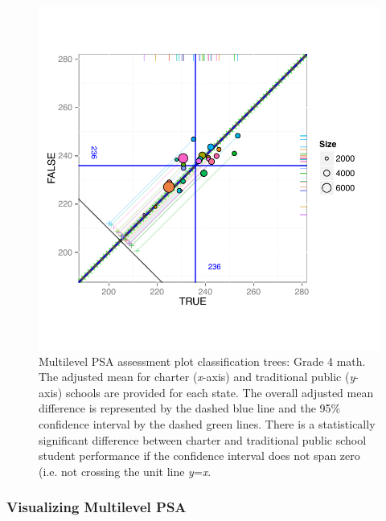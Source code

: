 \documentclass[letterpaper,12pt]{article} %
\begin{document}
\setlength{\belowcaptionskip}{-15pt}
\begin{figure}[t!]
\begin{center}
\includegraphics[width=\textwidth,trim=0 .1in 0 .5in]{../Figures2009/g4math-mlpsa-ctree-circ.pdf}
\caption[Multilevel PSA assessment plot classification trees: Grade 4 math]{Multilevel PSA assessment plot classification trees: Grade 4 math. The adjusted mean for charter (\textit{x}-axis) and traditional public (\textit{y}-axis) schools are provided for each state. The overall adjusted mean difference is represented by the dashed blue line and the 95\% confidence interval by the dashed green lines. There is a statistically significant difference between charter and traditional public school student performance if the confidence interval does not span zero (i.e. not crossing the unit line \textit{y}=\textit{x}.}
\label{fig:g4math-mlpsa-ctree}
\end{center}
\end{figure}
\setlength{\belowcaptionskip}{0pt}

\subsubsection{Visualizing Multilevel PSA}
\end{document}
